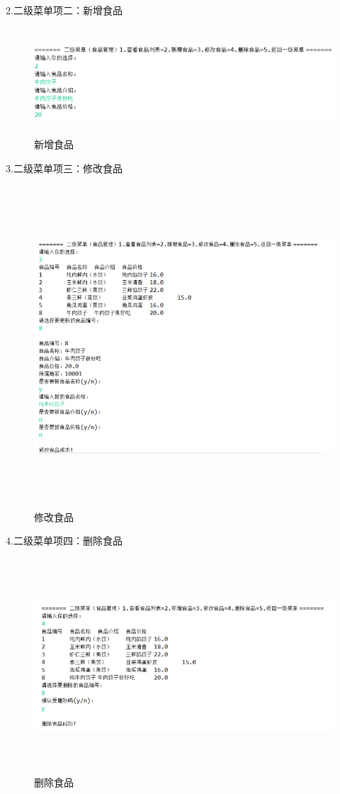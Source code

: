 2.二级菜单项二：新增食品

\begin{figure}[H]
    \centering
    \includegraphics[width=15cm,height=4cm]{figures/jdbc12.png}
    \caption{新增食品}
\end{figure}

3.二级菜单项三：修改食品

\begin{figure}[H]
    \centering
    \includegraphics[width=15cm,height=12cm]{figures/jdbc13.png}
    \caption{修改食品}
\end{figure}


4.二级菜单项四：删除食品

\begin{figure}[H]
    \centering
    \includegraphics[width=15cm,height=8cm]{figures/jdbc14.png}
    \caption{删除食品}
\end{figure}


